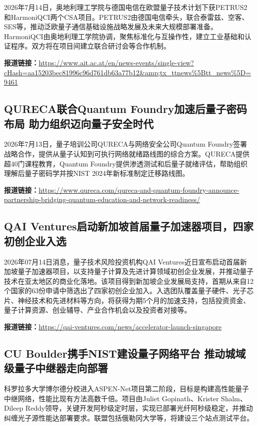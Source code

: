 \documentclass[12pt,a4paper]{ctexart}
\begin{document}
2026年7月14日，奥地利理工学院与德国电信在欧盟量子技术计划下获PETRUS2和HarmoniQCI两个CSA项目。PETRUS2由德国电信牵头，联合泰雷兹、空客、SES等，推动泛欧量子通信基础设施战略发展及未来大规模部署准备。HarmoniQCI由奥地利理工学院协调，聚焦标准化与互操作性，建立工业基础和认证程序。双方将在项目间建立联合研讨会等合作机制。

\noindent\textbf{报道链接：}\url{https://www.ait.ac.at/en/news-events/single-view?cHash=aa15203bec81996c96d761db63a77b12\&amp;tx\_ttnews\%5Btt\_news\%5D=9461}

\subsection{ QURECA联合Quantum Foundry加速后量子密码布局 助力组织迈向量子安全时代 }

2026年7月13日，量子培训公司QURECA与网络安全公司Quantum Foundry签署战略合作，提供从量子认知到可执行网络就绪路线图的综合方案。QURECA提供超40门课程教育，Quantum Foundry提供渗透测试和后量子就绪评估，帮助组织理解后量子密码学并按NIST 2024年新标准制定迁移路线图。

\noindent\textbf{报道链接：}\url{https://www.qureca.com/qureca-and-quantum-foundry-announce-partnership-bridging-quantum-education-and-network-readiness/}

\subsection{ QAI Ventures启动新加坡首届量子加速器项目，四家初创企业入选 }

2026年07月14日消息，量子技术风险投资机构QAI Ventures近日宣布启动首届新加坡量子加速器项目，以支持量子计算及先进计算领域初创企业发展，并推动量子技术在亚太地区的商业化落地。该项目得到新加坡企业发展局支持，首期从来自12个国家的63份申请中筛选出了四家初创企业加入。入选团队覆盖量子硬件、光子芯片、神经技术和先进材料等方向，将获得为期5个月的加速支持，包括投资资金、量子计算资源、创业辅导、产业合作机会以及投资者对接等。

\noindent\textbf{报道链接：}\url{https://qai-ventures.com/news/accelerator-launch-singapore}

\subsection{ CU Boulder携手NIST建设量子网络平台 推动城域级量子中继器走向部署 }

科罗拉多大学博尔德分校进入ASPEN-Net项目第二阶段，目标是构建高性能量子中继网络，性能比现有方法高数千倍。项目由Juliet Gopinath、Krister Shalm、Dileep Reddy领导，关键开发阿秒级定时层，实现已部署光纤阿秒级稳定，并推动纠缠光子源性能达部署要求。联盟包括俄勒冈大学等，将建设三个站点测试平台。
\end{document}
